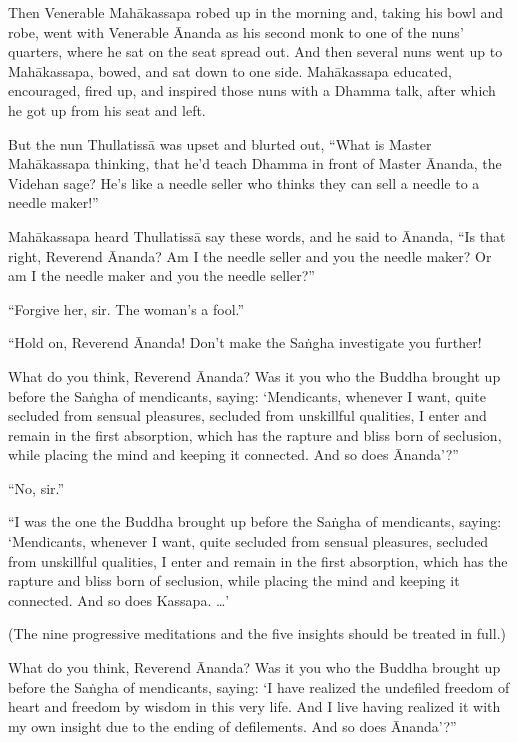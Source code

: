 \documentclass[12pt,openany]{book}%
\begin{document}
Then Venerable \textsanskrit{Mahākassapa} robed up in the morning and, taking his bowl and robe, went with Venerable Ānanda as his second monk to one of the nuns’ quarters, where he sat on the seat spread out. And then several nuns went up to \textsanskrit{Mahākassapa}, bowed, and sat down to one side. \textsanskrit{Mahākassapa} educated, encouraged, fired up, and inspired those nuns with a Dhamma talk, after which he got up from his seat and left. 

But the nun \textsanskrit{Thullatissā} was upset and blurted out, “What is Master \textsanskrit{Mahākassapa} thinking, that he’d teach Dhamma in front of Master Ānanda, the Videhan sage? He’s like a needle seller who thinks they can sell a needle to a needle maker!” 

\textsanskrit{Mahākassapa} heard \textsanskrit{Thullatissā} say these words, and he said to Ānanda, “Is that right, Reverend Ānanda? Am I the needle seller and you the needle maker? Or am I the needle maker and you the needle seller?” 

“Forgive her, sir. The woman’s a fool.” 

“Hold on, Reverend Ānanda! Don’t make the \textsanskrit{Saṅgha} investigate you further! 

What do you think, Reverend Ānanda? Was it you who the Buddha brought up before the \textsanskrit{Saṅgha} of mendicants, saying: ‘Mendicants, whenever I want, quite secluded from sensual pleasures, secluded from unskillful qualities, I enter and remain in the first absorption, which has the rapture and bliss born of seclusion, while placing the mind and keeping it connected. And so does Ānanda’?” 

“No, sir.” 

“I was the one the Buddha brought up before the \textsanskrit{Saṅgha} of mendicants, saying: ‘Mendicants, whenever I want, quite secluded from sensual pleasures, secluded from unskillful qualities, I enter and remain in the first absorption, which has the rapture and bliss born of seclusion, while placing the mind and keeping it connected. And so does Kassapa. …’ 

(The nine progressive meditations and the five insights should be treated in full.) 

What do you think, Reverend Ānanda? Was it you who the Buddha brought up before the \textsanskrit{Saṅgha} of mendicants, saying: ‘I have realized the undefiled freedom of heart and freedom by wisdom in this very life. And I live having realized it with my own insight due to the ending of defilements. And so does Ānanda’?” 
\end{document}
